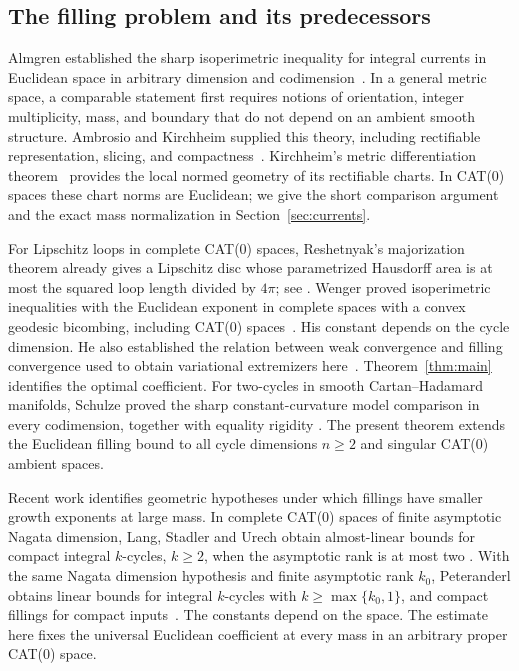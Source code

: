 \subsection{The filling problem and its predecessors}

Almgren established the sharp isoperimetric inequality for integral
currents in Euclidean space in arbitrary dimension and
codimension~\cite{Almgren1986}. In a general metric space, a comparable
statement first requires notions of orientation, integer multiplicity,
mass, and boundary that do not depend on an ambient smooth structure.
Ambrosio and Kirchheim supplied this theory, including rectifiable
representation, slicing, and compactness~\cite{AK2000}.
Kirchheim's metric differentiation theorem~\cite{Kirchheim1994}
provides the local normed geometry of its rectifiable charts. In CAT(0)
spaces these chart norms are Euclidean; we give the short comparison
argument and the exact mass normalization in Section~\ref{sec:currents}.

For Lipschitz loops in complete CAT(0) spaces, Reshetnyak's majorization
theorem already gives a Lipschitz disc whose parametrized Hausdorff area
is at most the squared loop length divided by $4\pi$; see
\cite[Section~3.2, Lemma~3.2]{LytchakWenger2018}.
Wenger proved isoperimetric inequalities with the Euclidean exponent
in complete spaces with a convex geodesic bicombing, including CAT(0)
spaces~\cite{Wenger2005Iso}. His constant depends on the cycle
dimension. He also established the relation between weak convergence
and filling convergence used to obtain variational extremizers
here~\cite{Wenger2007Flat}. Theorem~\ref{thm:main} identifies the optimal
coefficient. For two-cycles in smooth Cartan--Hadamard manifolds,
Schulze proved the sharp constant-curvature model comparison in every
codimension, together with equality rigidity
\cite[Theorems~1.2--1.3]{Schulze2020}. The present theorem extends the
Euclidean filling bound to all cycle dimensions $n\ge2$ and singular CAT(0)
ambient spaces.

Recent work identifies geometric hypotheses under which fillings
have smaller growth exponents at large mass. In complete CAT(0)
spaces of finite asymptotic Nagata dimension, Lang, Stadler and Urech
obtain almost-linear bounds for compact integral $k$-cycles, $k\ge2$,
when the asymptotic rank is at most two
\cite[Theorem~1.1]{LangStadlerUrech2026}. With the same Nagata dimension
hypothesis and finite asymptotic rank $k_0$, Peteranderl obtains linear
bounds for integral $k$-cycles with $k\ge\max\{k_0,1\}$, and compact
fillings for compact inputs~\cite[Theorem~1.2]{Peteranderl2026}.
The constants depend on the space. The estimate here fixes the universal
Euclidean coefficient at every mass in an arbitrary proper CAT(0) space.

